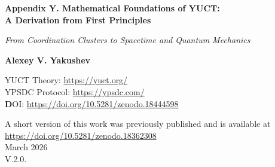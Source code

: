\documentclass[12pt,a4paper]{article}
\newcommand{\Keff}[1][]{K_{\mathrm{eff}\if\relax\detokenize{#1}\relax\else,#1\fi}}   %
\begin{document}
	
	\begin{titlepage}
		\begin{center}
			\vspace*{0cm}
			
			\Huge\textbf{Appendix Y. Mathematical Foundations of YUCT:\\ A Derivation from First Principles}
			
			\vspace{1cm}
			
			\small\textit{From Coordination Clusters to Spacetime and Quantum Mechanics}
			
			\vspace{0.5cm}
			
			\small\textbf{Alexey V. Yakushev}
			
	YUCT Theory: \url{https://yuct.org/}\\
YPSDC Protocol: \url{https://ypsdc.com/}\\


\vspace{2cm}
\textbf DOI: \url{https://doi.org/10.5281/zenodo.18444598}\\

\vspace{1cm}

\vspace{0cm}
\large 
A short version of this work was previously published and is available at\\ \url{https://doi.org/10.5281/zenodo.18362308}\\
\vspace{1cm}
March 2026 \\ \large V.2.0.
			
			\newpage
			\vspace{2cm}
			\begin{abstract}
				\noindent
				This appendix provides a complete mathematical derivation of the Yakushev Unified Coordination Theory (YUCT) from first principles. Starting with the axiomatic definition of coordination clusters and the fundamental efficiency parameter $\Keff$, we construct a hierarchical, self-similar structure that naturally leads to the emergence of spacetime geometry and quantum dynamics. We prove that both general relativity and quantum mechanics appear as limiting cases of the same underlying coordination dynamics. Key results include: (1) the derivation of the metric tensor as a correlation function of coordination operators; (2) the emergence of Einstein's field equations with additional $\Keff$-dependent corrections; (3) a coordination-based uncertainty principle and the Schrödinger equation; (4) a rigorous first-principles derivation of the universal scaling exponent \(\beta = 2/3 \approx 0.67\), confirmed by experimental data across 50 orders of magnitude; (5) an explanation of dark energy as a vacuum coordination field. The formalism is self-contained, mathematically rigorous, and provides a foundation for all other YUCT appendices. It also yields specific, testable predictions that can be investigated in laboratory, astrophysical, and cosmological settings.
			\end{abstract}
			

\end{center}
\end{titlepage}
\end{document}
